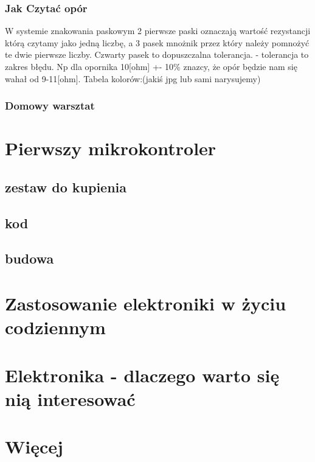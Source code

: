 	\subsection{Jak Czytać opór}
	W systemie znakowania paskowym 2 pierwsze paski oznaczają wartość rezystancji którą czytamy jako jedną liczbę, a 3 pasek mnożnik przez który należy pomnożyć te dwie pierwsze liczby.
Czwarty pasek to dopuszczalna tolerancja. - tolerancja to zakres błędu. Np dla opornika 10[ohm] +- 10\% znazcy, że opór będzie nam się wahał od 9-11[ohm].
Tabela kolorów:(jakiś jpg lub sami narysujemy)

	\subsection {Domowy warsztat}
    
%        
        
\newpage
\chapter{Pierwszy mikrokontroler}
	\section{zestaw do kupienia}
	\section{kod}
	\section{budowa}
\chapter {Zastosowanie elektroniki w życiu codziennym }
\chapter{Elektronika - dlaczego warto się nią interesować}
\chapter {Więcej}





